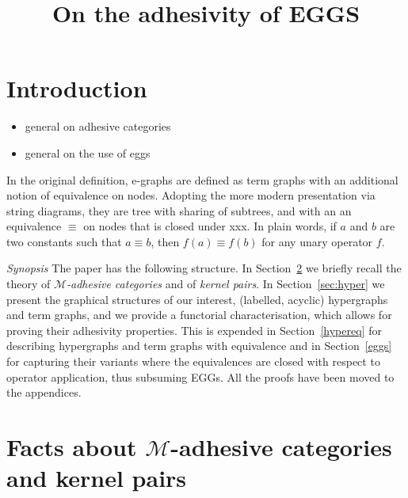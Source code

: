 \documentclass[a4paper,UKenglish,cleveref,pdftex,thm-restate,numberwithinsect]{lipics-v2021}
\title{On the adhesivity of EGGS}
\begin{document}

\maketitle 

\begin{abstract}
\end{abstract}


\section{Introduction}

\begin{itemize}
\item general on adhesive categories
\item general on the use of eggs
\end{itemize}

In the original definition, e-graphs are defined as term graphs with an additional notion of equivalence on nodes. 
Adopting the more modern presentation via string diagrams, they are tree with sharing of subtrees, and with an 
an equivalence $\equiv$ on nodes that is closed under xxx. In plain words, if $a$ and $b$ are two constants such that
$a \equiv b$, then $f(a) \equiv f(b)$ for any unary operator $f$.

\cite[Section~4.2]{DetlefsNS05}
\cite{WillseyNWFTP21}


\emph{Synopsis}
The paper has the following structure. 
In Section~\ref{sec:ade} we briefly recall 
the theory of
\emph{$\mathcal{M}$-adhesive categories}
and of \emph{kernel pairs}.
In Section~\ref{sec:hyper} we present the graphical structures of our interest, 
 (labelled, acyclic) hypergraphs and term graphs, and we provide a
functorial characterisation, which allows for proving their adhesivity properties.
This is expended in Section~\ref{hypereq} for describing hypergraphs 
and term graphs with equivalence and in Section~\ref{eggs} for capturing
their variants where the equivalences are closed with respect to operator application,
thus subsuming EGGs.
%
All the proofs have been moved to the appendices. 

\section{Facts about $\mathcal{M}$-adhesive categories and kernel pairs}\label{sec:ade}
\end{document}

